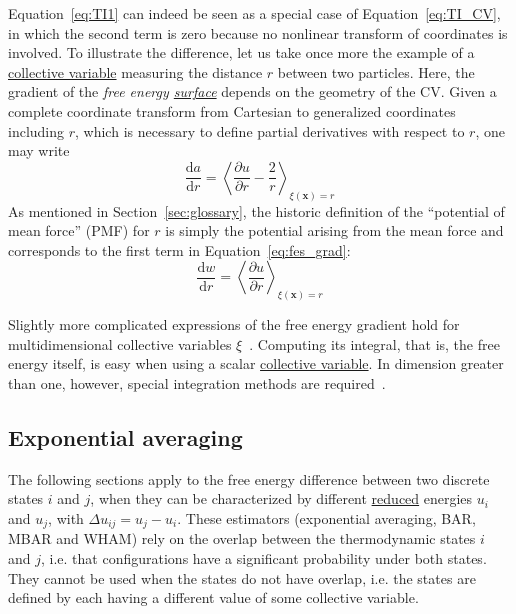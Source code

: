 \documentclass[9pt,review]{livecoms}
\newcommand{\vx}{\mathbf{x}}
\begin{document}
Equation~\ref{eq:TI1} can indeed be seen as a special case of Equation~\ref{eq:TI_CV}, in which the second term is zero because no nonlinear transform of coordinates is involved. To illustrate the difference, let us take once more the example of a \hyperlink{ref:CV} {collective variable} measuring the distance $r$ between two particles. Here, the gradient of the \textit{free energy \hyperlink{ref:FES} {surface}} depends on the geometry of the CV. Given a complete coordinate transform from Cartesian to generalized coordinates including $r$, which is necessary to define partial derivatives with respect to $r$, one may write~\cite{Henin2010a}
\begin{equation}
    \frac{\mathrm{d}a}{\mathrm{d}r} = \left\langle \frac{\partial u}{\partial r}
    - \frac{2}{r} \right\rangle_{\xi(\vx) = r}
    \label{eq:fes_grad}
\end{equation}
As mentioned in Section~\ref{sec:glossary}, the historic definition of the ``potential of mean force'' (PMF) for $r$ is simply the potential arising from the mean force and corresponds to the first term in Equation~\ref{eq:fes_grad}:
\begin{equation}
    \frac{\mathrm{d} w}{\mathrm{d} r} = \left\langle \frac{\partial u}{\partial r} \right\rangle_{\xi(\vx) = r}
    \label{eq:pmf_grad}
\end{equation}

Slightly more complicated expressions of the free energy gradient hold for multidimensional collective variables $\xi$~\cite{Carter1989, denOtter2000, Henin2004, Ciccotti2005, lelievre-rousset-stoltz-07-a, Darve2008, Lesage2017}. Computing its integral, that is, the free energy itself, is easy when using a scalar \hyperlink{ref:CV} {collective variable}. In dimension greater than one, however, special integration methods are required~\cite{Henin2021integration}.


\subsection{Exponential averaging}
\label{sec:fe_estimators:EXP}

The following sections apply to the free energy difference between two discrete states $i$ and $j$, when they can be characterized by different \hyperlink{ref:reduced} {reduced} energies $u_i$ and $u_j$, with $\Delta u_{ij} = u_j - u_i$.
These estimators (exponential averaging, BAR, MBAR and WHAM) rely on the overlap between the thermodynamic states $i$ and $j$, i.e. that configurations have a significant probability under both states. They cannot be used when the states do not have overlap, i.e. the states are defined by each having a different value of some collective variable.
\end{document}
